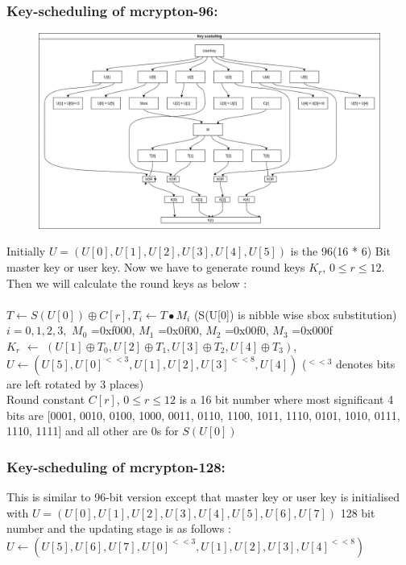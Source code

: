 \documentclass{transcrypto}
\begin{document}
		\subsubsection{Key-scheduling of mcrypton-96:}
		\begin{figure}[H]
			\includegraphics[width=1\linewidth]{KeyScedulling.png}
		\end{figure}
		 Initially $U = ( U[0], U[1], U[2], U[3], U[4], U[5])$ is the  96(16 * 6) Bit master key or user key. Now we have to generate round keys $K_{r}$, $0\leq r\leq 12$. Then we will calculate the round keys as below :\\\\
		$T \leftarrow S(U[0]) \oplus C[r], T_i \leftarrow T \bullet M_i$  (S(U[0]) is nibble wise sbox substitution)\\
		$i = 0, 1, 2, 3,$ $M_0$ =0xf000, $M_1$ =0x0f00, $M_2$ =0x00f0, $M_3$ =0x000f\\
		$K_r$ $\leftarrow$ $(U[1] \oplus T_0, U[2] \oplus T_1, U[3] \oplus T_2, U[4] \oplus T_3)$,\\
		$U \leftarrow (U[5], U[0]^{<<3}, U[1], U[2], U[3]^{<<8}, U[4])$ ($^{<<3}$ denotes bits are left rotated by 3 places)\\
		Round constant $C[r]$, $0\leq r \leq 12$ is a 16 bit number where most significant 4 bits are [0001, 0010, 0100, 1000, 0011, 0110, 1100, 1011, 1110, 0101, 1010, 0111, 1110, 1111] and all other are 0s for $S(U[0])$ 
			
		\subsubsection{Key-scheduling of mcrypton-128:}
		This is similar to 96-bit version except that master key or user key is initialised with $U = ( U[0], U[1], U[2], U[3], U[4], U[5], U[6], U[7])$ 128 bit number and the updating stage is as follows :\\
		$U \leftarrow (U[5], U[6], U[7], U[0]^{<<3}, U[1], U[2], U[3], U[4]^{<<8})$ 
\end{document}
